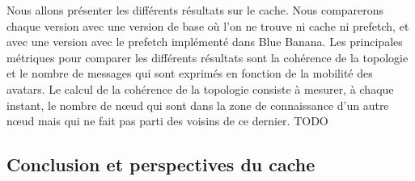 Nous allons présenter les différents résultats sur le cache. Nous comparerons chaque version avec une version de base où l'on ne trouve ni cache ni prefetch, et avec une version avec le prefetch implémenté dans Blue Banana.
Les principales métriques pour comparer les différents résultats sont la cohérence de la topologie et le nombre de messages qui sont exprimés en fonction de la mobilité des avatars. Le calcul de la cohérence de la topologie consiste à mesurer, à chaque instant, le nombre de nœud qui sont dans la zone de connaissance d'un autre nœud mais qui ne fait pas parti des voisins de ce dernier.
TODO




\subsection{Conclusion et perspectives du cache} 



